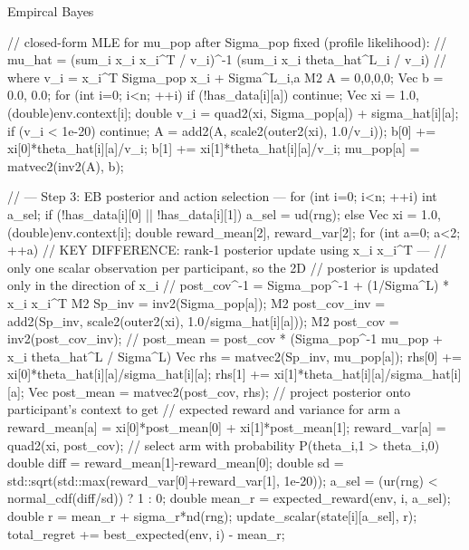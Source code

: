 \documentclass[letterpaper, 9pt]{extarticle}
\begin{document}
\begin{codechunk} {Empircal Bayes}
{{        // closed-form MLE for mu_pop after Sigma_pop fixed (profile likelihood):
        //   mu_hat = (sum_i x_i x_i^T / v_i)^{-1} (sum_i x_i theta_hat^L_i / v_i)
        //   where v_i = x_i^T Sigma_pop x_i + Sigma^L_{i,a}
        M2  A = {0,0,0,0};
        Vec b = {0.0, 0.0};
        for (int i=0; i<n; ++i) {
            if (!has_data[i][a]) continue;
            Vec xi = {1.0, (double)env.context[i]};
            double v_i = quad2(xi, Sigma_pop[a]) + sigma_hat[i][a];
            if (v_i < 1e-20) continue;
            A = add2(A, scale2(outer2(xi), 1.0/v_i));
            b[0] += xi[0]*theta_hat[i][a]/v_i;
            b[1] += xi[1]*theta_hat[i][a]/v_i;
        }
        mu_pop[a] = matvec2(inv2(A), b);
    }

    // --- Step 3: EB posterior and action selection ---
    for (int i=0; i<n; ++i) {
        int a_sel;
        if (!has_data[i][0] || !has_data[i][1]) {
            a_sel = ud(rng);
        } else {
            Vec xi = {1.0, (double)env.context[i]};
            double reward_mean[2], reward_var[2];
            for (int a=0; a<2; ++a) {
                // KEY DIFFERENCE: rank-1 posterior update using x_i x_i^T —
                // only one scalar observation per participant, so the 2D
                // posterior is updated only in the direction of x_i
                // post_cov^{-1} = Sigma_pop^{-1} + (1/Sigma^L) * x_i x_i^T
                M2 Sp_inv       = inv2(Sigma_pop[a]);
                M2 post_cov_inv = add2(Sp_inv,
                                      scale2(outer2(xi), 1.0/sigma_hat[i][a]));
                M2 post_cov     = inv2(post_cov_inv);
                // post_mean = post_cov * (Sigma_pop^{-1} mu_pop + x_i theta_hat^L / Sigma^L)
                Vec rhs = matvec2(Sp_inv, mu_pop[a]);
                rhs[0] += xi[0]*theta_hat[i][a]/sigma_hat[i][a];
                rhs[1] += xi[1]*theta_hat[i][a]/sigma_hat[i][a];
                Vec post_mean = matvec2(post_cov, rhs);
                // project posterior onto participant's context to get
                // expected reward and variance for arm a
                reward_mean[a] = xi[0]*post_mean[0] + xi[1]*post_mean[1];
                reward_var[a]  = quad2(xi, post_cov);
            }
            // select arm with probability P(theta_{i,1} > theta_{i,0})
            double diff = reward_mean[1]-reward_mean[0];
            double sd   = std::sqrt(std::max(reward_var[0]+reward_var[1], 1e-20));
            a_sel = (ur(rng) < normal_cdf(diff/sd)) ? 1 : 0;
        }
        double mean_r = expected_reward(env, i, a_sel);
        double r      = mean_r + sigma_r*nd(rng);
        update_scalar(state[i][a_sel], r);
        total_regret += best_expected(env, i) - mean_r;
    }
}
\end{codechunk}
\end{document}
